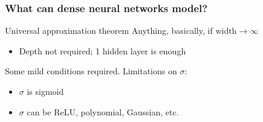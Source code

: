 \begin{frame}
    \frametitle{What can dense neural networks model?}
    \begin{block}{Universal approximation theorem}
        Anything, basically, if $\text{width} \to \infty$
        \begin{itemize}
            \item Depth not required; 1 hidden layer is enough
        \end{itemize}
    \end{block}

    Some mild conditions required.
    Limitations on $\sigma$:
    \begin{itemize}
        \item $\sigma$ is sigmoid \citep{CybenkoMCSS89,HornikNN89,HornikNN91}
        \item $\sigma$ can be ReLU, polynomial, Gaussian, etc. \citep{SonodaACHA}
    \end{itemize}
\end{frame}

